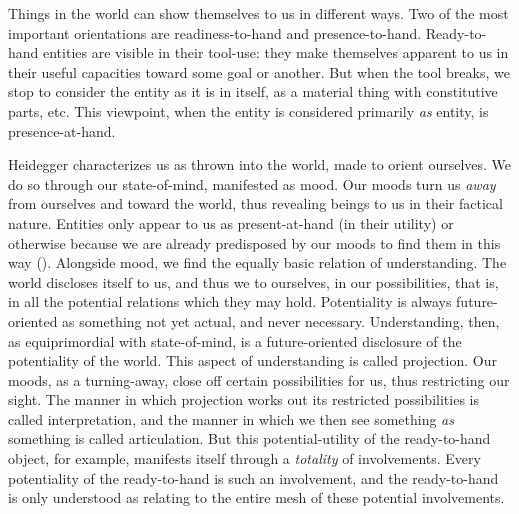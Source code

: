 \documentclass[leqno, 12pt]{turabian-researchpaper}
\begin{document}

	Things in the world can show themselves to us in different ways. Two of the
	most important orientations are readiness-to-hand and presence-to-hand. Ready-to-hand
	entities are visible in their tool-use: they make themselves apparent to us in
	their useful capacities toward some goal or another. But when the tool breaks,
	we stop to consider the entity as it is in itself, as a material thing with constitutive
	parts, etc. This viewpoint, when the entity is considered primarily \emph{as} entity,
	is presence-at-hand.

	Heidegger characterizes us as thrown into the world, made to orient ourselves.
	We do so through our state-of-mind, manifested as mood. Our moods turn us
	\emph{away} from ourselves and toward the world, thus revealing beings to us
	in their factical nature. Entities only appear to us as present-at-hand (in
	their utility) or otherwise because we are already predisposed by our moods to
	find them in this way (). Alongside mood, we
	find the equally basic relation of understanding. The world discloses itself
	to us, and thus we to ourselves, in our possibilities, that is, in all the
	potential relations which they may hold. Potentiality is always future-oriented
	as something not yet actual, and never necessary. Understanding, then, as equiprimordial
	with state-of-mind, is a future-oriented disclosure of the potentiality of the
	world. This aspect of understanding is called projection. Our moods, as a turning-away,
	close off certain possibilities for us, thus restricting our sight. The manner
	in which projection works out its restricted possibilities is called
	interpretation, and the manner in which we then see something \emph{as}
	something is called articulation. But this potential-utility of the ready-to-hand
	object, for example, manifests itself through a \emph{totality} of
	involvements. Every potentiality of the ready-to-hand is such an involvement,
	and the ready-to-hand is only understood as relating to the entire mesh of
	these potential involvements.
\end{document}
